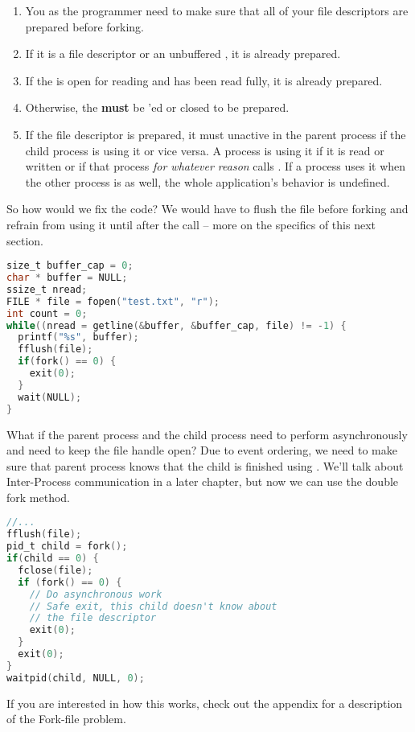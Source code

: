 \begin{enumerate}
\item You as the programmer need to make sure that all of your file descriptors are prepared before forking.
\item If it is a file descriptor or an unbuffered , it is already prepared.
\item If the  is open for reading and has been read fully, it is already prepared.
\item Otherwise, the  \textbf{must} be 'ed or closed to be prepared.
\item If the file descriptor is prepared, it must unactive in the parent process if the child process is using it or vice versa. A process is using it if it is read or written or if that process \textit{for whatever reason} calls . If a process uses it when the other process is as well, the whole application's behavior is undefined.
\end{enumerate}

So how would we fix the code?
We would have to flush the file before forking and refrain from using it until after the  call -- more on the specifics of this next section.

\begin{lstlisting}[language=C]
size_t buffer_cap = 0;
char * buffer = NULL;
ssize_t nread;
FILE * file = fopen("test.txt", "r");
int count = 0;
while((nread = getline(&buffer, &buffer_cap, file) != -1) {
  printf("%s", buffer);
  fflush(file);
  if(fork() == 0) { 
    exit(0);
  }
  wait(NULL);
}
\end{lstlisting}

What if the parent process and the child process need to perform asynchronously and need to keep the file handle open?
Due to event ordering, we need to make sure that parent process knows that the child is finished using .
We'll talk about Inter-Process communication in a later chapter, but now we can use the double fork method.

\begin{lstlisting}[language=C]
//... 
fflush(file);
pid_t child = fork();
if(child == 0) { 
  fclose(file);
  if (fork() == 0) {
    // Do asynchronous work
    // Safe exit, this child doesn't know about
    // the file descriptor
    exit(0);
  }
  exit(0);
}
waitpid(child, NULL, 0);
\end{lstlisting}

If you are interested in how this works, check out the appendix for a description of the Fork-file problem.

